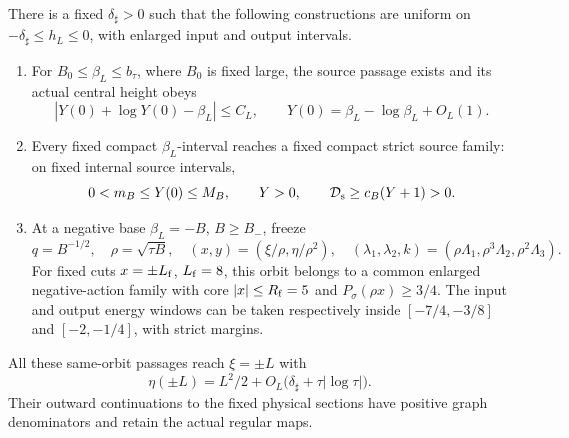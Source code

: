 \begin{lemma}
\label{bd:lem-source-ranges}
There is a fixed \(\delta_\sharp>0\) such that the following
constructions are uniform on \(-\delta_\sharp\le h_L\le0\), with
enlarged input and output intervals.
\begin{enumerate}
\item For \(B_0\le\beta_L\le b_\tau\), where \(B_0\) is fixed
large, the source passage exists and its actual central height obeys
\begin{equation}\label{bd:positive-height}
 |Y(0)+\log Y(0)-\beta_L|\le C_L,
 \qquad Y(0)=\beta_L-\log\beta_L+O_L(1).
\end{equation}
\item Every fixed compact \(\beta_L\)-interval reaches a fixed
compact strict source family: on fixed internal source intervals,
\begin{equation}\label{bd:compact-height}
 0<m_B\le Y(0)\le M_B,\qquad
 Y>0,\qquad \mathcal D_{\rm s}\ge c_B(Y+1)>0.
\end{equation}
\item At a negative base \(\beta_L=-B\), \(B\ge B_-\), freeze
\begin{equation}\label{bd:frozen-dictionary}
 q=B^{-1/2},\quad \rho=\sqrt{\tau B},\quad
 (x,y)=(\xi/\rho,\eta/\rho^2),\quad
 (\lambda_1,\lambda_2,k)
       =(\rho\Lambda_1,\rho^3\Lambda_2,\rho^2\Lambda_3).
\end{equation}
For fixed cuts \(x=\pm L_{\rm f}\), \(L_{\rm f}=8\), this orbit
belongs to a common enlarged negative-action family with core
\(|x|\le R_{\rm f}=5\) and \(P_\sigma(\rho x)\ge3/4\).
The input and output energy windows can be taken respectively inside
\([-7/4,-3/8]\) and \([-2,-1/4]\), with strict margins.
\end{enumerate}
All these same-orbit passages reach \(\xi=\pm L\) with
\begin{equation}\label{bd:parabolic-cuts}
 \eta(\pm L)=L^2/2+
 O_L\bigl(\delta_\sharp+\tau|\log\tau|\bigr).
\end{equation}
Their outward continuations to the fixed physical sections have
positive graph denominators and retain the actual regular maps.
\end{lemma}
